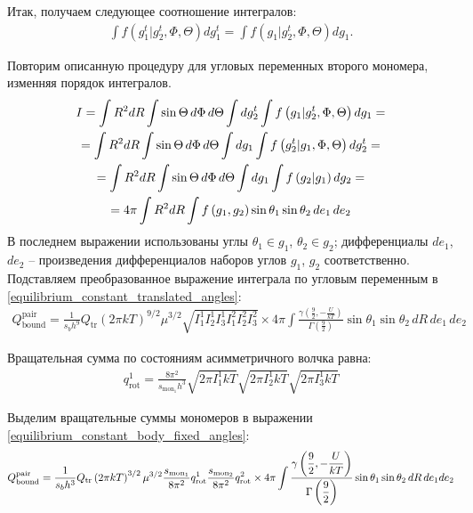 \documentclass[14pt]{extarticle}
\newcommand{\lb}{\left(}
\newcommand{\rb}{\right)}
\begin{document}
Итак, получаем следующее соотношение интегралов:
\begin{gather}
	\int f \lb g_1^t \rvert g_2^t, \Phi, \Theta \rb dg_1^t = \int f \lb g_1 \rvert g_2^t, \Phi, \Theta \rb dg_1.
\end{gather}

Повторим описанную процедуру для угловых переменных второго мономера, изменняя порядок интегралов.
\begin{gather}
	I = \int R^2 dR \int \sin \Theta \, d\Phi \, d\Theta \int dg_2^t \int f \lb g_1 \rvert g_2^t, \Phi, \Theta \rb dg_1 = \notag \\  
	= \int R^2 dR \int \sin \Theta \, d\Phi \, d\Theta \int dg_1 \int f \lb g_2^t \rvert g_1, \Phi, \Theta \rb dg_2^t = \notag \\
	= \int R^2 dR \int \sin \Theta \, d\Phi \, d\Theta \int dg_1 \int f \lb g_2 \rvert g_1 \rb dg_2 = \notag \\
	= 4 \pi \int R^2 dR \int f \lb g_1, g_2 \rb \sin \theta_1 \sin \theta_2 \, de_1 \, de_2 
\end{gather}
В последнем выражении использованы углы $\theta_1 \in g_1$, $\theta_2 \in g_2$; дифференциалы $de_1$, $de_2$ -- произведения дифференциалов наборов углов $g_1$, $g_2$ соответственно. Подставляем преобразованное выражение интеграла по угловым переменным в \eqref{equilibrium_constant_translated_angles}:
\begin{gather}
		Q_{\text{bound}}^{\text{pair}} = \frac{1}{s_b h^9} Q_{\text{tr}} \lb 2 \pi k T \rb^{9/2} \mu^{3/2} \sqrt{I_1^1 I_2^1 I_3^1 I_1^2 I_2^2 I_3^2} \times 4 \pi \int \frac{\displaystyle \gamma \lb \frac{9}{2}, - \frac{U}{k T} \rb}{\displaystyle \Gamma \lb \frac{9}{2} \rb} \sin \theta_1 \sin \theta_2 \, dR \, de_1 \, de_2 \label{equilibrium_constant_body_fixed_angles}
\end{gather}

Вращательная сумма по состояниям асимметричного волчка равна:
\begin{gather}
		q_{\text{rot}}^1 = \frac{8 \pi^2}{s_{\text{mon}_1} h^3} \sqrt{2 \pi I_1^1 k T} \sqrt{2 \pi I_2^1 k T} \sqrt{2 \pi I_3^1 k T} 
\end{gather}

Выделим вращательные суммы мономеров в выражении \eqref{equilibrium_constant_body_fixed_angles}:
\begin{gather}
	Q_{\text{bound}}^{\text{pair}} = \frac{1}{s_b h^3} Q_{\text{tr}} \lb 2 \pi k T \rb^{3/2} \mu^{3/2} \frac{s_{\text{mon}_1}}{8 \pi^2} q_{\text{rot}}^1 \frac{s_{\text{mon}_2}}{8 \pi^2} q_{\text{rot}}^2 \times 4 \pi \int \frac{\displaystyle \gamma \lb \frac{9}{2}, - \frac{U}{k T} \rb}{\displaystyle \Gamma \lb \frac{9}{2} \rb} \sin \theta_1 \sin \theta_2 \, dR \, de_1 de_2 \notag
\end{gather}
\end{document}
